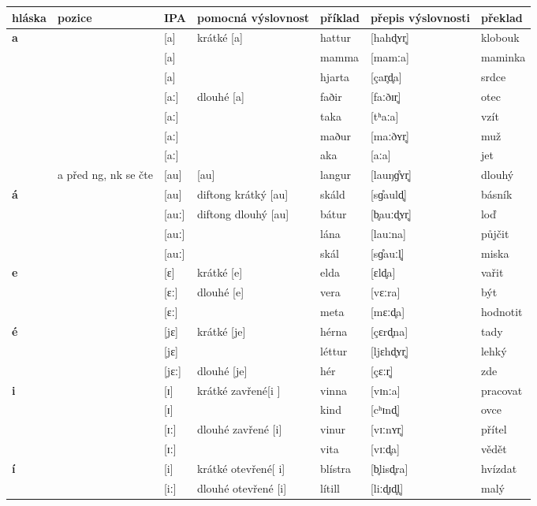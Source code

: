 \begin{longtable}{>{\bfseries}lX>{\IPAFont}lXl>{\IPAFont}ll}
\toprule
  \textbf{hláska} & \textbf{pozice} & \normalfont\textbf{IPA} & \textbf{pomocná výslovnost} & \textbf{příklad} & \normalfont\textbf{přepis výslovnosti} & \textbf{překlad} \\
\midrule
\endhead
a &  & {[a]} & krátké [a] & hattur & {[hahd̥ʏr̥]} & klobouk \\ 
 &  & {[a]} &  & mamma & {[mamːa]} & maminka \\ 
 &  & {[a]} &  & hjarta & {[çar̥d̥a]} & srdce \\ 
 &  & {[aː]} & dlouhé [a] & faðir & {[faːðɪr̥]} & otec \\ 
 &  & {[aː]} &  & taka & {[tʰaːa]} & vzít \\ 
 &  & {[aː]} &  & maður & {[maːðʏr̥]} & muž \\ 
 &  & {[aː]} &  & aka & {[aːa]} & jet \\ 
 & a před ng, nk se čte & {[au]} & [au] & langur & {[lauŋɡ̊ʏr̥]} & dlouhý \\ 
á &  & {[au]} & diftong krátký [au] & skáld & {[sɡ̊auld̥]} & básník \\ 
 &  & {[auː]} & diftong dlouhý [au] & bátur & {[b̥auːd̥ʏr̥]} & loď \\ 
 &  & {[auː]} &  & lána & {[lauːna]} & půjčit \\ 
 &  & {[auː]} &  & skál  & {[sɡ̊auːl̥]} & miska \\ 
e &  & {[ɛ]} & krátké [e] & elda & {[ɛld̥a]} & vařit \\ 
 &  & {[ɛː]} & dlouhé [e] & vera & {[vɛːra]} & být \\ 
 &  & {[ɛː]} &  & meta & {[mɛːd̥a]} & hodnotit \\ 
é &  & {[jɛ]} & krátké [je] & hérna & {[çɛrd̥na]} & tady \\ 
 &  & {[jɛ]} &  & léttur & {[ljɛhd̥ʏr̥]} & lehký \\ 
 &  & {[jɛː]} & dlouhé [je] & hér & {[çɛːr̥]} & zde \\ 
i &  & {[ɪ]} & krátké zavřené[i ] & vinna & {[vɪnːa]} & pracovat \\ 
 &  & {[ɪ]} &  & kind & {[cʰɪnd̥]} & ovce \\ 
 &  & {[ɪː]} & dlouhé zavřené [i] & vinur & {[vɪːnʏr̥]} & přítel \\ 
 &  & {[ɪː]} &  & vita & {[vɪːd̥a]} & vědět \\ 
í &  & {[i]} & krátké otevřené[ i] & blístra & {[b̥lisd̥ra]} & hvízdat \\ 
 &  & {[iː]} & dlouhé otevřené [i] & lítill & {[liːd̥ɪd̥l̥]} & malý \\ 

\end{longtable}
